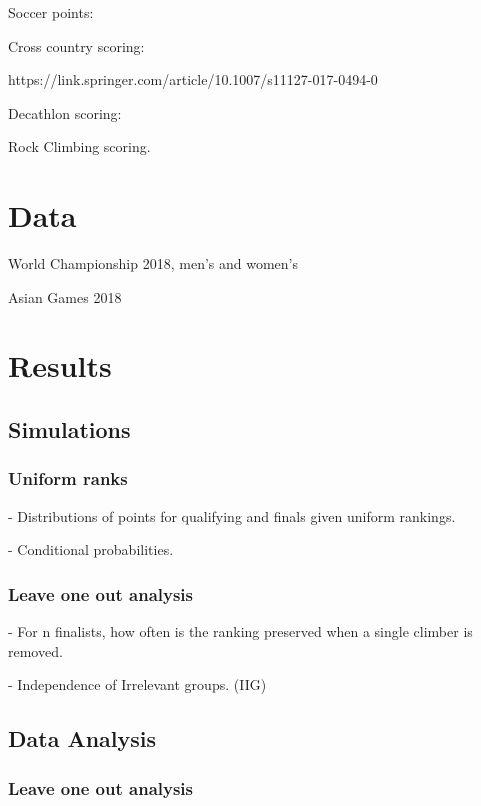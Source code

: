 \documentclass{article}\usepackage[]{graphicx}\usepackage[]{color}
\begin{document}
Soccer points: %

Cross country scoring: %

https://link.springer.com/article/10.1007/s11127-017-0494-0\cite{BoudreauEtAl2018}

Decathlon scoring: %

Rock Climbing scoring.  

\section{Data}

World Championship 2018, men's and women's

Asian Games 2018

\section{Results}

\subsection{Simulations}
\subsubsection{Uniform ranks}

- Distributions of points for qualifying and finals given uniform rankings. 

- Conditional probabilities.  

\subsubsection{Leave one out analysis} 

- For n finalists, how often is the ranking preserved when a single climber is removed.

- Independence of Irrelevant groups.  (IIG)


\subsection{Data Analysis} 
\subsubsection{Leave one out analysis} 
\end{document}
